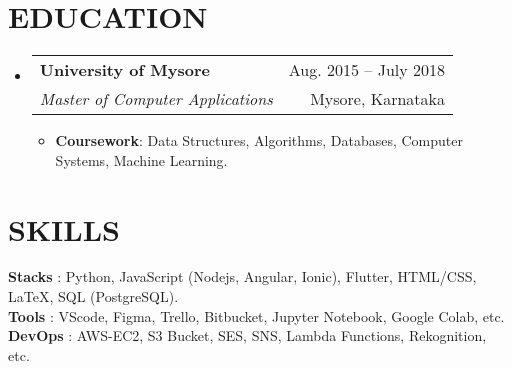 \documentclass[letterpaper,11pt]{article}
\makeatletter
\newcommand{\resumeItem}[1]{
  \item\small{
    {#1 \vspace{-1pt}}
  }
}
\newcommand{\resumeSubheading}[4]{
  \vspace{-1pt}\item
    \begin{tabular*}{\textwidth}[t]{l@{\extracolsep{\fill}}r}
      \textbf{#1} & {\color{dark-grey}\small #2}\vspace{1pt}\\ %
      \textit{#3} & {\color{dark-grey} \small #4}\\ %
    \end{tabular*}\vspace{-4pt}
}
\newcommand{\resumeSubHeadingListStart}{\begin{itemize}[leftmargin=0in, label={}]}
\newcommand{\resumeSubHeadingListEnd}{\end{itemize}}
\newcommand{\resumeItemListStart}{\begin{itemize}}
\newcommand{\resumeItemListEnd}{\end{itemize}\vspace{0pt}}
\makeatother
\begin{document}
\section {EDUCATION}
  \resumeSubHeadingListStart
    \resumeSubheading
      {University of Mysore}{Aug. 2015 -- July 2018}
      {Master of Computer Applications}{Mysore, Karnataka}
      	\resumeItemListStart
    	\resumeItem {\textbf{Coursework}: Data Structures, Algorithms, Databases, Computer Systems, Machine Learning.}
        \resumeItemListEnd
  \resumeSubHeadingListEnd

%
\section{SKILLS}
 \begin{itemize}[leftmargin=0in, label={}]
    \small{\item{
     \textbf{Stacks} {: Python, JavaScript (Nodejs, Angular, Ionic), Flutter, HTML/CSS, LaTeX, SQL (PostgreSQL).}\vspace{2pt} \\
     \textbf{Tools}     {: VScode, Figma, Trello, Bitbucket, Jupyter Notebook, Google Colab, etc.}\\
     \textbf{DevOps}     {: AWS-EC2, S3 Bucket, SES, SNS, Lambda Functions, Rekognition, etc.}
    }}
 \end{itemize}


\end{document}
